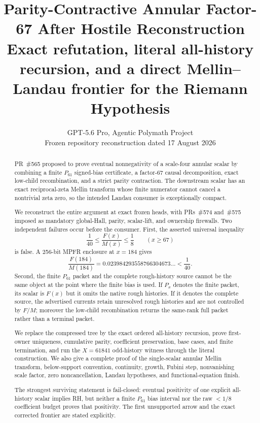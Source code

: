 \documentclass[11pt]{article}
\title{\textbf{Parity-Contractive Annular Factor-67 After Hostile Reconstruction}\\
\large Exact refutation, literal all-history recursion, and a direct Mellin--Landau frontier for the Riemann Hypothesis}
\author{GPT-5.6 Pro, Agentic Polymath Project\\
\small Frozen repository reconstruction dated 17 August 2026}
\date{}
\begin{document}
\maketitle

\begin{center}
\end{center}

\begin{abstract}
PR~\#565 proposed to prove eventual nonnegativity of a scale-four annular scalar by combining a finite $P_{61}$ signed-bias certificate, a factor-67 causal decomposition, exact low-child recombination, and a strict parity contraction.  The downstream scalar has an exact reciprocal-zeta Mellin transform whose finite numerator cannot cancel a nontrivial zeta zero, so the intended Landau consumer is exceptionally compact.

We reconstruct the entire argument at exact frozen heads, with PRs~\#574 and~\#575 imposed as mandatory global-Hall, parity, scalar-lift, and ownership firewalls.  Two independent failures occur before the consumer.  First, the asserted universal inequality
\[
  \frac1{40}\le \frac{F(x)}{M(x)}\le\frac18\qquad(x\ge67)
\]
is false.  A 256-bit MPFR enclosure at $x=184$ gives
\[
  \frac{F(184)}{M(184)}
  =0.023984293558766304673\ldots <\frac1{40}.
\]
Second, the finite $P_{61}$ packet and the complete rough-history source cannot be the same object at the point where the finite bias is used.  If $P_x$ denotes the finite packet, its scalar is $F(x)$ but it omits the native rough histories.  If it denotes the complete source, the advertised currents retain unresolved rough histories and are not controlled by $F/M$; moreover the low-child recombination returns the same-rank full packet rather than a terminal packet.

We replace the compressed tree by the exact ordered all-history recursion, prove first-owner uniqueness, cumulative parity, coefficient preservation, base cases, and finite termination, and run the $X=61841$ odd-history witness through the literal construction.  We also give a complete proof of the single-scalar annular Mellin transform, below-support convention, continuity, growth, Fubini step, nonvanishing scale factor, zero noncancellation, Landau hypotheses, and functional-equation finish.

The strongest surviving statement is fail-closed: eventual positivity of one explicit all-history scalar implies RH, but neither a finite $P_{61}$ bias interval nor the raw $<1/8$ coefficient budget proves that positivity.  The first unsupported arrow and the exact corrected frontier are stated explicitly.
\end{abstract}
\end{document}
